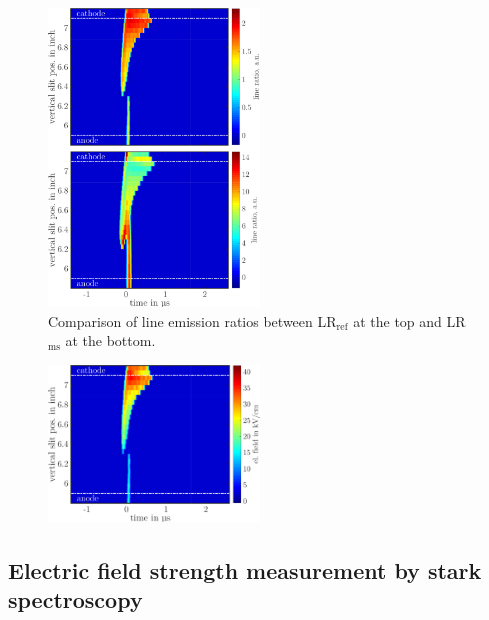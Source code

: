 \documentclass[a4paper,10pt,twoside]{article}
\newcommand{\ix}[1]{_\text{#1}}
\begin{document}
				\begin{figure}
					\centering
					\hspace{-0.5cm}\includegraphics[width=0.5\textwidth]{figures/lineratio/combinations/lineratio667over706.pdf}
					\caption{Comparison of line emission ratios between LR$\ix{ref}$ at the top and LR$\ix{ms}$ at the bottom.}
					\label{img:comparisonlineratio}
				\end{figure}
				
				\begin{figure}
					\centering
					\hspace{0.5cm}\includegraphics[width=0.5\textwidth]{figures/lineratio/combinations/electricfield667.pdf}
					\caption{}
					\label{img:elfield667}
				\end{figure}
		
		\subsection{Electric field strength measurement by stark spectroscopy}
		
\end{document}
